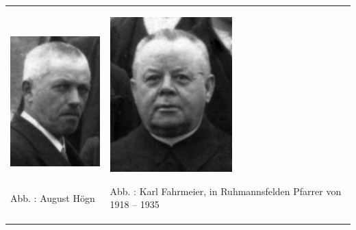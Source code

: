 \begin{center}
\begin{minipage}{9.638cm}
\begin{center}
\tablefirsthead{}
\tablehead{}
\tabletail{}
\tablelasttail{}
\begin{supertabular}{m{4.333cm}m{4.905cm}}

\includegraphics[width=4.15cm,height=6.006cm]{pictures/August-Hoegn_Nachruf.jpg}

Abb. : August Högn &

\includegraphics[width=4.722cm,height=5.994cm]{pictures/zulassungsarbeit-img029.jpg}

Abb. : Karl Fahrmeier, in Ruhmannsfelden
Pfarrer von 1918 – 1935\\
\end{supertabular}
\end{center}
\end{minipage}
\end{center}
